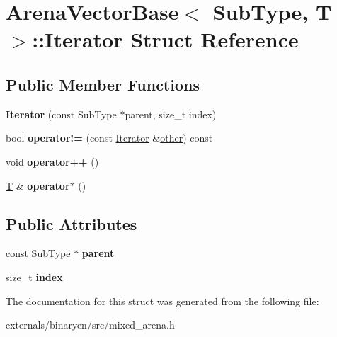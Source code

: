 \hypertarget{struct_arena_vector_base_1_1_iterator}{}\section{Arena\+Vector\+Base$<$ Sub\+Type, T $>$\+:\+:Iterator Struct Reference}
\label{struct_arena_vector_base_1_1_iterator}
\subsection*{Public Member Functions}
\begin{DoxyCompactItemize}
\item 
\mbox{\label{struct_arena_vector_base_1_1_iterator_a8582f5ed79e8a2125cb85c3452d3da48}} 
{\bfseries Iterator} (const Sub\+Type $\ast$parent, size\+\_\+t index)
\item 
\mbox{\label{struct_arena_vector_base_1_1_iterator_a1a33c5635e88016b961bf927440f0577}} 
bool {\bfseries operator!=} (const \mbox{\hyperlink{struct_arena_vector_base_1_1_iterator}{Iterator}} \&\mbox{\hyperlink{structother}{other}}) const
\item 
\mbox{\label{struct_arena_vector_base_1_1_iterator_a719d92f5531930a67971f32acf857476}} 
void {\bfseries operator++} ()
\item 
\mbox{\label{struct_arena_vector_base_1_1_iterator_ad025ffaff34c0ec549bd2f68fb4b0008}} 
\mbox{\hyperlink{struct_t}{T}} \& {\bfseries operator$\ast$} ()
\end{DoxyCompactItemize}
\subsection*{Public Attributes}
\begin{DoxyCompactItemize}
\item 
\mbox{\label{struct_arena_vector_base_1_1_iterator_a7b97220a53aa400f87688eaf2454e0fb}} 
const Sub\+Type $\ast$ {\bfseries parent}
\item 
\mbox{\label{struct_arena_vector_base_1_1_iterator_a4dce3f0176687d2087fe9c88d29ee7fa}} 
size\+\_\+t {\bfseries index}
\end{DoxyCompactItemize}


The documentation for this struct was generated from the following file\+:\begin{DoxyCompactItemize}
\item 
externals/binaryen/src/mixed\+\_\+arena.\+h\end{DoxyCompactItemize}
